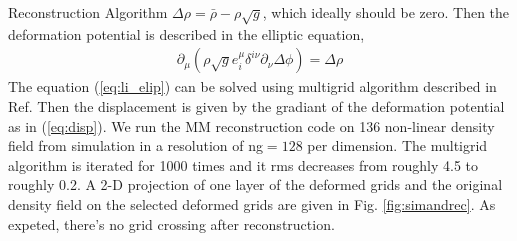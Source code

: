 \begin{section}{Reconstruction Algorithm}
$\Delta \rho = \bar{\rho}-\rho \sqrt{g}$, which ideally should be zero. Then the 
deformation potential is described in the elliptic equation,
\begin{align}
 \label{eq:li_elip}
    \partial _\mu (\rho \sqrt{g} e^\mu _i \delta^{i\nu}\partial_\nu \Delta \phi)=\Delta \rho
\end{align}
The equation (\ref{eq:li_elip}) can be solved using multigrid algorithm described in Ref. 
\cite{bib:Pen1995,bib:Pen1998} Then the displacement is given by the gradiant of the deformation 
potential as in (\ref{eq:disp}). We run the MM reconstruction code on 136 non-linear density field from simulation 
in a resolution of ng$=128$ per dimension. The multigrid algorithm is iterated for 1000 times and it rms 
decreases from roughly 4.5 to roughly 0.2. 
A 2-D projection of one layer of the deformed grids and the 
original density field on the selected deformed grids are given in Fig. \ref{fig:simandrec}. 
As expeted, there's no grid crossing after reconstruction.
%
\end{section}

